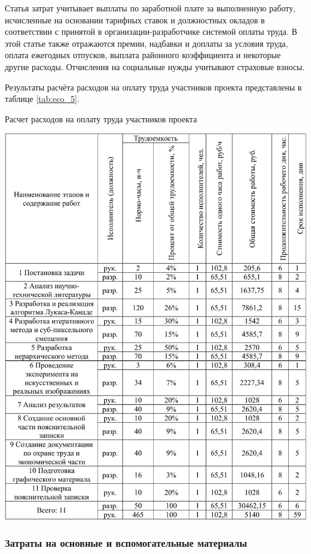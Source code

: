 Статья затрат учитывает выплаты по заработной плате за выполненную работу, исчисленные на основании тарифных ставок и должностных окладов в соответствии с принятой в организации-разработчике системой оплаты труда. В этой статье также отражаются премии, надбавки и доплаты за условия труда, оплата ежегодных отпусков, выплата районного коэффициента и некоторые другие расходы. Отчисления на социальные нужды учитывают страховые взносы.

Результаты расчёта расходов на оплату труда участников проекта представлены в таблице \ref{tab:eco_5}.

\begin{table}[!ht]
\caption{Расчет расходов на оплату труда участников проекта}
\centering
\includegraphics[page=5, width=1\linewidth]{econom_table.pdf}
\label{tab:eco_5}
\end{table}

\subsubsection{Затраты на основные и вспомогательные материалы}

